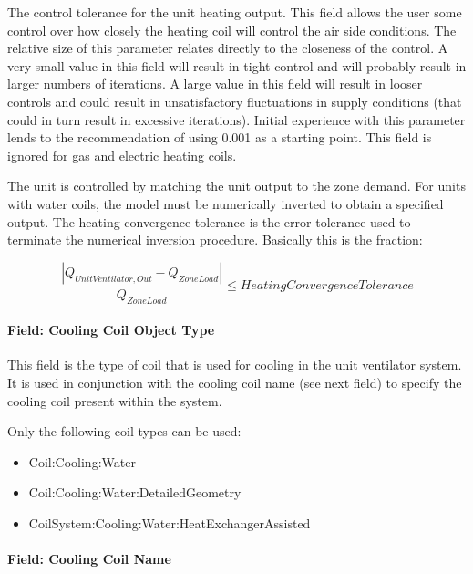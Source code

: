 The control tolerance for the unit heating output. This field allows the user some control over how closely the heating coil will control the air side conditions. The relative size of this parameter relates directly to the closeness of the control. A very small value in this field will result in tight control and will probably result in larger numbers of iterations. A large value in this field will result in looser controls and could result in unsatisfactory fluctuations in supply conditions (that could in turn result in excessive iterations). Initial experience with this parameter lends to the recommendation of using 0.001 as a starting point. This field is ignored for gas and electric heating coils.

The unit is controlled by matching the unit output to the zone demand. For units with water coils, the model must be numerically inverted to obtain a specified output. The heating convergence tolerance is the error tolerance used to terminate the numerical inversion procedure. Basically this is the fraction:

\begin{equation}
\frac{{\left| {{Q_{UnitVentilator,Out}} - {Q_{ZoneLoad}}} \right|}}{{{Q_{ZoneLoad}}}} \le HeatingConvergenceTolerance
\end{equation}

\paragraph{Field: Cooling Coil Object Type}\label{field-cooling-coil-object-type-1-001}

This field is the type of coil that is used for cooling in the unit ventilator system. It is used in conjunction with the cooling coil name (see next field) to specify the cooling coil present within the system.

Only the following coil types can be used:

\begin{itemize}
\item
  Coil:Cooling:Water
\item
  Coil:Cooling:Water:DetailedGeometry
\item
  CoilSystem:Cooling:Water:HeatExchangerAssisted
\end{itemize}

\paragraph{Field: Cooling Coil Name}\label{field-cooling-coil-name-1-001}

